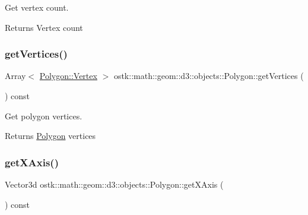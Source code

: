 Get vertex count. 

\begin{DoxyReturn}{Returns}
Vertex count 
\end{DoxyReturn}
\mbox{\label{classostk_1_1math_1_1geom_1_1d3_1_1objects_1_1_polygon_ae5cb46e0bdcf9a9f59f03d05e2706301}} 
\subsubsection{\texorpdfstring{get\+Vertices()}{getVertices()}}
{\footnotesize\ttfamily Array$<$ \hyperlink{classostk_1_1math_1_1geom_1_1d3_1_1objects_1_1_polygon_a314eaf277355d59f5e6ab775702c47c2}{Polygon\+::\+Vertex} $>$ ostk\+::math\+::geom\+::d3\+::objects\+::\+Polygon\+::get\+Vertices (\begin{DoxyParamCaption}{ }\end{DoxyParamCaption}) const}



Get polygon vertices. 

\begin{DoxyReturn}{Returns}
\hyperlink{classostk_1_1math_1_1geom_1_1d3_1_1objects_1_1_polygon}{Polygon} vertices 
\end{DoxyReturn}
\mbox{\label{classostk_1_1math_1_1geom_1_1d3_1_1objects_1_1_polygon_a6ed413b82f3a145de4babbb9f6a9fd34}} 
\subsubsection{\texorpdfstring{get\+X\+Axis()}{getXAxis()}}
{\footnotesize\ttfamily Vector3d ostk\+::math\+::geom\+::d3\+::objects\+::\+Polygon\+::get\+X\+Axis (\begin{DoxyParamCaption}{ }\end{DoxyParamCaption}) const}



